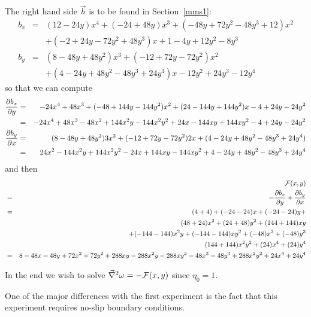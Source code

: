 The right hand side $\vec{b}$ is to be found in Section~\ref{mms1}:
\begin{eqnarray}
b_x &=& (12 - 24y) x^4 + (-24 + 48y) x^3 + (-48y + 72y^2 - 48 y^3 + 12) x^2 \nonumber\\
    && + (-2 + 24y -72y^2+48y^3)x + 1-4y + 12y^2-8y^3 \nonumber\\ 
b_y &=& (8 - 48y + 48 y^2) x^3 + (-12 + 72y - 72y^2) x^2  \nonumber\\
    && + (4 - 24y + 48y^2 - 48y^3 + 24y^4) x - 12y^2 + 24y^3 - 12y^4  \nonumber
\end{eqnarray}
so that we can compute 
\begin{eqnarray}
\frac{\partial b_x}{\partial y}
&=& -24 x^4 + 48 x^3 + (-48 + 144y - 144 y^2 ) x^2  + ( 24 -144 y+ 144y^2)x -4 + 24y-24y^2 \nonumber\\ 
&=& -24 x^4 + 48 x^3 -48x^2 + 144x^2y - 144 x^2y^2 +  24x -144x y+ 144xy^2  -4 + 24y-24y^2 \nonumber\\ 
\frac{\partial b_y}{\partial x} 
&=& (8 - 48y + 48 y^2) 3x^2 + (-12 + 72y - 72y^2) 2x  + (4 - 24y + 48y^2 - 48y^3 + 24y^4)   \nonumber\\
&=& 24x^2 - 144x^2y + 144x^2 y^2 -24x + 144xy - 144xy^2 + 4 - 24y + 48y^2 - 48y^3 + 24y^4   \nonumber
\end{eqnarray}
and then 
\begin{eqnarray}
&&{\cal F}(x,y)\nonumber\\
&=&-\frac{\partial b_x}{\partial y}
+\frac{\partial b_y}{\partial x} \nonumber\\
&=&(4+4)+(-24-24)x+(-24-24)y+ \nonumber\\
&&(48+24)x^2 + (24+48)y^2 +(144+144)xy \nonumber\\
&&+ (-144-144)x^2y + (-144-144)xy^2 + (-48)x^3 + (-48)y^3 \nonumber\\
&& (144+144)x^2y^2  +(24)x^4+(24)y^4 \nonumber\\
&=& 8 -48x-48y + 72x^2 +72y^2 + 288 xy -288x^2y -288 xy^2 -48x^3-48y^3 + 288x^2y^2 +24x^4 +24 y^4 \nonumber
\end{eqnarray}


In the end we wish to solve $\vec\nabla^2 \omega = -{\cal F}(x,y)$ since $\eta_0=1$.

One of the major differences with the first experiment is the 
fact that this experiment requires no-slip boundary conditions.






